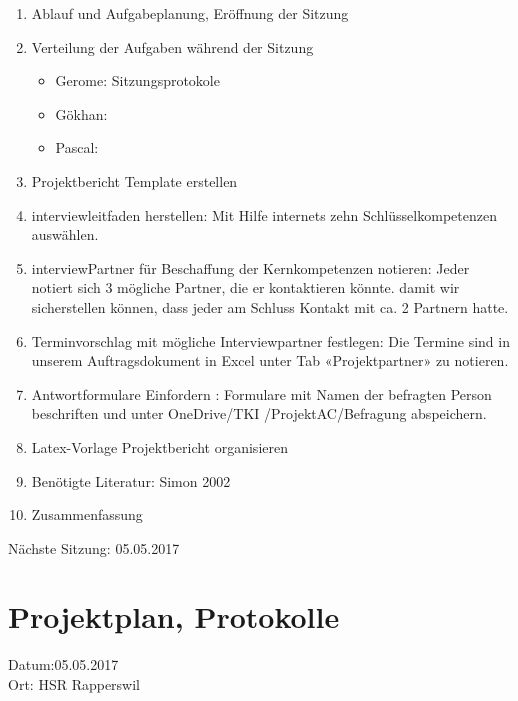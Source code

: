 \begin{enumerate}

\item Ablauf und Aufgabeplanung, Eröffnung der Sitzung 

\item  Verteilung der Aufgaben während der Sitzung
\begin{itemize}
\item Gerome: Sitzungsprotokole
\item Gökhan: 
\item Pascal: 
\end{itemize}

\item	Projektbericht Template erstellen

\item  interviewleitfaden herstellen:  Mit Hilfe internets zehn Schlüsselkompetenzen auswählen.

\item 	interviewPartner für Beschaffung der Kernkompetenzen notieren: Jeder notiert sich 3 mögliche Partner, die er kontaktieren könnte. damit wir   sicherstellen können, dass jeder am Schluss Kontakt mit ca. 2 Partnern hatte.

\item 	Terminvorschlag mit mögliche Interviewpartner festlegen:  Die Termine sind in unserem Auftragsdokument in Excel unter Tab «Projektpartner» zu notieren.

\item	Antwortformulare Einfordern : Formulare mit Namen der befragten Person beschriften und unter OneDrive/TKI /ProjektAC/Befragung abspeichern.


\item Latex-Vorlage Projektbericht organisieren

\item Benötigte Literatur: Simon 2002   \cite{simon2002entwicklung}

\item Zusammenfassung

\end{enumerate}

Nächste Sitzung: 05.05.2017

\newpage
\section*{Projektplan, Protokolle}

Datum:05.05.2017\\
Ort: HSR Rapperswil

